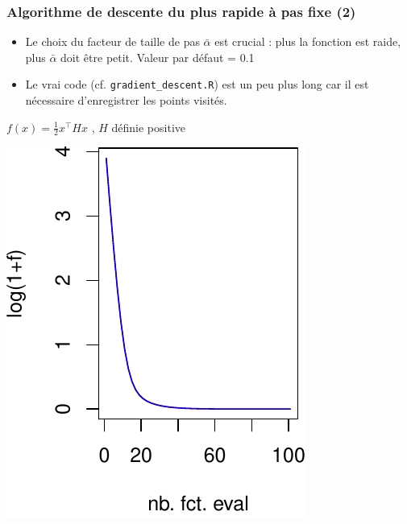 \documentclass[12pt]{beamer}
\begin{document}
\begin{frame}
\frametitle{Algorithme de descente du plus rapide à pas fixe (2)} 
\begin{itemize}
\item Le choix du facteur de taille de pas $\bar\alpha$ est crucial : plus la fonction est raide, plus $\bar\alpha$ doit être petit. Valeur par défaut = 0.1
\item Le vrai code (cf. \texttt{gradient\_descent.R}) est un peu plus long car il est nécessaire d’enregistrer les points visités.
\end{itemize}
\vspace{-0.5cm}
\begin{center}
{\scriptsize $f(x) = \frac{1}{2} x^\top H x$ , $H$ définie positive}\\
\begin{minipage}[b]{0.3\textwidth}
\includegraphics[width=\textwidth]{gradient_quad_2d_f_alpha01-crop.pdf} 
\end{minipage}
\hspace{1.5cm}

\end{center}
\end{frame}
\end{document}
